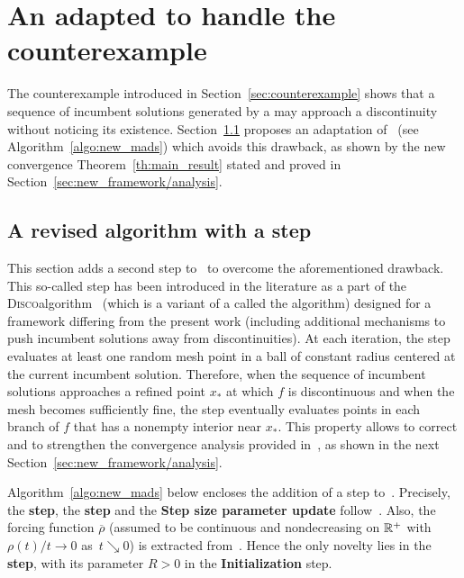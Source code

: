 \section{An adapted \ddsm to handle the counterexample}
\label{sec:new_framework}

The counterexample introduced in Section~\ref{sec:counterexample} shows that a sequence of incumbent solutions generated by a \ddsm may approach a discontinuity without noticing its existence.
Section~\ref{sec:new_framework/mads} proposes an adaptation of~\cite[Algorithm~2.1]{ViCu2012} (see Algorithm~\ref{algo:new_mads}) which avoids this drawback, as shown by the new convergence Theorem~\ref{th:main_result} stated and proved in Section~\ref{sec:new_framework/analysis}.



\subsection{A revised algorithm with a \revpoll step}
\label{sec:new_framework/mads}

This section adds a second \poll step to~\cite[Algorithm~2.1]{ViCu2012} to overcome the aforementioned drawback.
This so-called \revpoll step has been introduced in the literature as a part of the \textsc{Disco}\mads algorithm~\cite{AuBaKo22} (which is a variant of a \ddsm called the \mads algorithm) designed for a framework differing from the present work (including additional mechanisms to push incumbent solutions away from discontinuities).
At each iteration, the \revpoll step evaluates at least one random mesh point in a ball of constant radius centered at the current incumbent solution.
Therefore, when the sequence of incumbent solutions approaches a refined point $x_*$ at which $f$ is discontinuous and when the mesh becomes sufficiently fine, the \revpoll step eventually evaluates points in each branch of $f$ that has a nonempty interior near $x_*$.
This property allows to correct and to strengthen the convergence analysis provided in~\cite{ViCu2012}, as shown in the next Section~\ref{sec:new_framework/analysis}.

Algorithm~\ref{algo:new_mads} below encloses the addition of a \revpoll step to~\cite[Algorithm~2.1]{ViCu2012}.
Precisely, the \textbf{\search step}, the \textbf{\poll step} and the \textbf{Step size parameter update} follow~\cite[Algorithm~2.1]{ViCu2012}.
Also, the forcing function $\overline{\rho}$ (assumed to be continuous and nondecreasing on $\mathbb{R}^+$ with~$\rho(t)/t \to 0$ as~$t \searrow 0$) is extracted from~\cite[Algorithm~2.1]{ViCu2012}. Hence the only novelty lies in the \textbf{\revpoll step}, with its parameter $R>0$ in the \textbf{Initialization} step.

